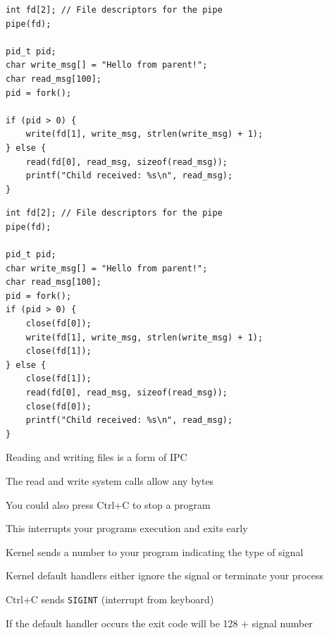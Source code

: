 \begin{slide}

    
    \begin{verbatim}
int fd[2]; // File descriptors for the pipe
pipe(fd);

pid_t pid;
char write_msg[] = "Hello from parent!";
char read_msg[100];
pid = fork(); 

if (pid > 0) {  
    write(fd[1], write_msg, strlen(write_msg) + 1);
} else {  
    read(fd[0], read_msg, sizeof(read_msg));
    printf("Child received: %s\n", read_msg);
}
\end{verbatim}
    
\end{slide}

\begin{slide}

    
    \begin{verbatim}
int fd[2]; // File descriptors for the pipe
pipe(fd);

pid_t pid;
char write_msg[] = "Hello from parent!";
char read_msg[100];
pid = fork(); 
if (pid > 0) {  
    close(fd[0]);
    write(fd[1], write_msg, strlen(write_msg) + 1);
    close(fd[1]);
} else {  
    close(fd[1]);
    read(fd[0], read_msg, sizeof(read_msg));
    close(fd[0]);
    printf("Child received: %s\n", read_msg);
}
\end{verbatim}
    
\end{slide}

  \begin{slide}


    Reading and writing files is a form of IPC
    \medskip

    The read and write system calls allow any bytes

  \end{slide}

\begin{slide}


    You could also press Ctrl+C to stop a program

    \leftspace{}This interrupts your programs execution and exits early
    \medskip

    Kernel sends a number to your program indicating the type of signal

    \leftspace{}Kernel default handlers either ignore the signal or terminate
    your process
    \medskip

    Ctrl+C sends \texttt{SIGINT} (interrupt from keyboard)
    \medskip

    If the default handler occurs the exit code will be 128 + signal number

\end{slide}

